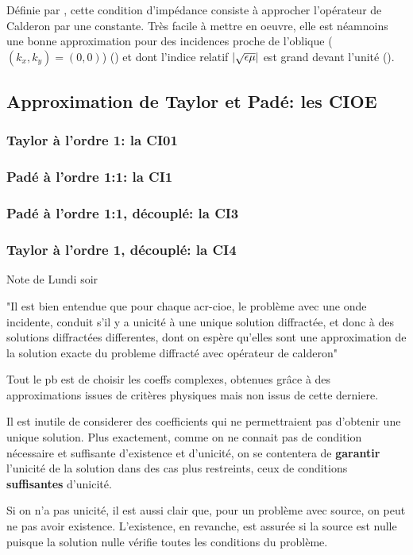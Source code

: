         Définie par \cite{leontovich_investigations_1948}, cette condition d'impédance consiste à approcher l'opérateur de Calderon par une constante.
        Très facile à mettre en oeuvre, elle est néamnoins une bonne approximation pour des incidences proche de l'oblique (\((k_x,k_y)=(0,0)\)) (\cite{leontovich_investigations_1948}) et dont l'indice relatif \(|\sqrt{\epsilon\mu}|\) est grand devant l'unité (\cite[par.~3, p.421-422]{senior_impedance_1960}).

    \subsection{Approximation de Taylor et Padé: les CIOE}

        \subsubsection{Taylor à l'ordre 1: la CI01}

        \subsubsection{Padé à l'ordre 1:1: la CI1}

        \subsubsection{Padé à l'ordre 1:1, découplé: la CI3}

        \subsubsection{Taylor à l'ordre 1, découplé: la CI4}

        \begin{REM}
            Note de Lundi soir

            "Il est bien entendue que pour chaque \gls{acr-cioe}, le problème avec une onde incidente, conduit s'il y a unicité à une unique solution diffractée, et donc à des solutions diffractées differentes, dont on espère qu'elles sont une approximation de la solution exacte du probleme diffracté avec opérateur de calderon"

            Tout le pb est de choisir les coeffs complexes, obtenues grâce à des approximations issues de critères physiques mais non issus de cette derniere. 

            Il est inutile de considerer des coefficients qui ne permettraient pas d'obtenir une unique solution.
            Plus exactement, comme on ne connait pas de condition nécessaire et suffisante d'existence et d'unicité, on se contentera de {\bf garantir} l'unicité de la solution dans des cas plus restreints, ceux de conditions {\bf suffisantes} d'unicité. 
            
            Si on n'a pas unicité, il est aussi clair que, pour un problème avec source, on peut ne pas avoir existence.
            L'existence, en revanche, est assurée si la source est nulle puisque la solution nulle vérifie toutes les conditions du problème.
        \end{REM}

